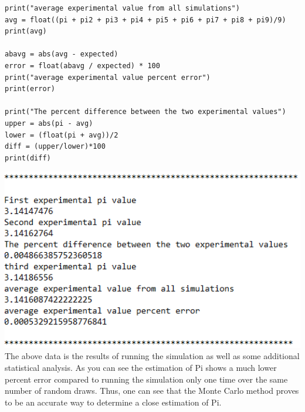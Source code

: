 \documentclass{llncs}
\begin{document}
\begin{lstlisting}
print("average experimental value from all simulations")
avg = float((pi + pi2 + pi3 + pi4 + pi5 + pi6 + pi7 + pi8 + pi9)/9)
print(avg)

abavg = abs(avg - expected)
error = float(abavg / expected) * 100
print("average experimental value percent error")
print(error)

print("The percent difference between the two experimental values")
upper = abs(pi - avg)
lower = (float(pi + avg))/2
diff = (upper/lower)*100
print(diff)    
\end{lstlisting}

\includegraphics[width=1\textwidth, center]{dataimage2}
The above data is the results of running the simulation as well as some additional statistical analysis. As you can see the estimation of Pi shows a much lower percent error compared to running the simulation only one time over the same number of random draws. Thus, one can see that the Monte Carlo method proves to be an accurate way to determine a close estimation of Pi.\\
\end{document}
